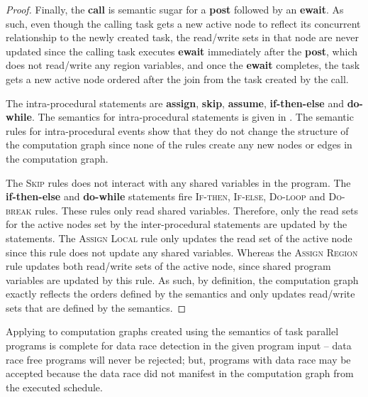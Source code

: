 \begin{proof}
Finally, the \textbf{call} is semantic sugar for a \textbf{post} followed by an \textbf{ewait}. As such, even though the calling task gets a new active node to reflect its concurrent relationship to the newly created task, the read/write sets in that node are never updated since the calling task executes \textbf{ewait} immediately after the \textbf{post}, which does not read/write any region variables, and once the \textbf{ewait} completes, the task gets a new active node ordered after the join from the task created by the call.

The intra-procedural statements are \textbf{assign}, \textbf{skip}, \textbf{assume}, \textbf{if-then-else} and \textbf{do-while}. The semantics for intra-procedural statements is given in . The semantic rules for intra-procedural events show that they do not change the structure of the computation graph since none of the rules create any new nodes or edges in the computation graph.

The \textsc{Skip} rules does not interact with any shared variables in the program. The \textbf{if-then-else} and \textbf{do-while} statements fire \textsc{If-then}, \textsc{If-else}, \textsc{Do-loop} and \textsc{Do-break} rules. These rules only read shared variables. Therefore, only the read sets for the active nodes set by the inter-procedural statements are updated by the statements. The \textsc{Assign Local} rule only updates the read set of the active node since this rule does not update any shared variables. Whereas the \textsc{Assign Region} rule updates both read/write sets of the active node, since shared program variables are updated by this rule. As such, by definition, the computation graph exactly reflects the orders defined by the semantics and only updates read/write sets that are defined by the semantics.
\end{proof}

\begin{corollary}
Applying  to computation graphs created using the semantics of task parallel programs is complete for data race detection in the given program input -- data race free programs will never be rejected; but, programs with data race may be accepted because the data race did not manifest in the computation graph from the executed schedule.
\end{corollary}

